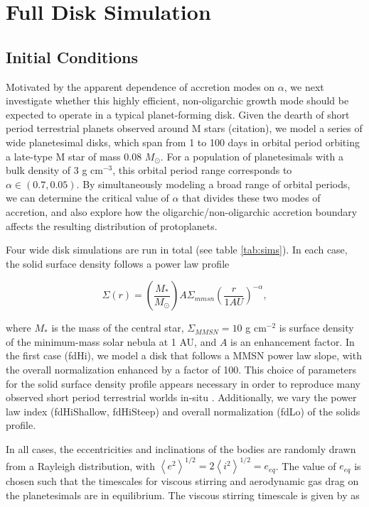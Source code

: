 \documentclass[twocolumn]{aastex63}
\begin{document}
\section{Full Disk Simulation}\label{sec:fulldisk}

\subsection{Initial Conditions}

Motivated by the apparent dependence of accretion modes on $\alpha$, we next investigate whether this highly efficient, non-oligarchic growth mode should be expected to operate in a typical planet-forming disk. Given the dearth of short period terrestrial planets observed around M stars (citation), we model a series of wide planetesimal disks, which span from 1 to 100 days in orbital period orbiting a late-type M star of mass 0.08 $M_{\odot}$. For a population of planetesimals with a bulk density of 3 g cm$^{-3}$, this orbital period range corresponds to $\alpha \in (0.7, 0.05)$. By simultaneously modeling a broad range of orbital periods, we can determine the critical value of $\alpha$ that divides these two modes of accretion, and also explore how the oligarchic/non-oligarchic accretion boundary affects the resulting distribution of protoplanets.

Four wide disk simulations are run in total (see table \ref{tab:sims}). In each case, the solid surface density follows a power law profile

\begin{equation}
	\Sigma(r) = \left( \frac{M_{*}}{M_{\odot}} \right) A \Sigma_{mmsn} \left( \frac{r}{1 AU} \right)^{-\alpha},
\end{equation}

\noindent where $M_{*}$ is the mass of the central star, $\Sigma_{MMSN} = 10$ g cm$^{-2}$ is surface density of the minimum-mass solar nebula \citep{hayashi81} at 1 AU, and $A$ is an enhancement factor. In the first case (fdHi), we model a disk that follows a MMSN power law slope, with the overall normalization enhanced by a factor of 100. This choice of parameters for the solid surface density profile appears necessary in order to reproduce many observed short period terrestrial worlds in-situ \citep{hansen12}. Additionally, we vary the power law index (fdHiShallow, fdHiSteep) and overall normalization (fdLo) of the solids profile.

In all cases, the eccentricities and inclinations of the bodies are randomly drawn from a Rayleigh distribution, with $\left< e^{2} \right>^{1/2} = 2\left<i^{2} \right>^{1/2} = e_{eq}$. The value of $e_{eq}$ is chosen such that the timescales for viscous stirring and aerodynamic gas drag on the planetesimals are in equilibrium. The viscous stirring timescale is given by \citet{ida93} as
\end{document}
